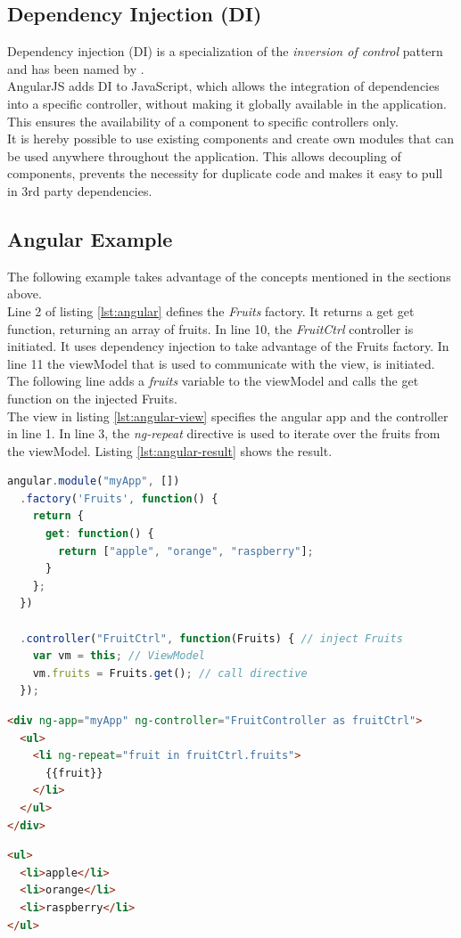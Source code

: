\subsection{Dependency Injection (DI)}
Dependency injection (DI) is a specialization of the \textit{inversion of control} pattern and has been named by \cite{fowler2004inversion}. \\
AngularJS adds DI to JavaScript, which allows the integration of dependencies into a specific controller, without making it globally available in the application. This ensures the availability of a component to specific controllers only.\\
It is hereby possible to use existing components and create own modules that can be used anywhere throughout the application. This allows decoupling of components, prevents the necessity for duplicate code and makes it easy to pull in 3rd party dependencies. 


\subsection{Angular Example}
The following example takes advantage of the concepts mentioned in the sections above. \\
Line 2 of listing \ref{lst:angular} defines the \textit{Fruits} factory. It returns a get get function, returning an array of fruits. In line 10, the \textit{FruitCtrl} controller is initiated. It uses dependency injection to take advantage of the Fruits factory. In line 11 the viewModel that is used to communicate with the view, is initiated. The following line adds a \textit{fruits} variable to the viewModel and calls the get function on the injected Fruits.\\
The view in listing \ref{lst:angular-view} specifies the angular app and the controller in line 1. In line 3, the \textit{ng-repeat} directive is used to iterate over the fruits from the viewModel. Listing \ref{lst:angular-result} shows the result.

\begin{lstlisting}[language=javascript, caption=AngularJS directive and controller definition, label=lst:angular]
angular.module("myApp", [])
  .factory('Fruits', function() {
    return {
      get: function() {
        return ["apple", "orange", "raspberry"];
      }
    };
  })
  
  .controller("FruitCtrl", function(Fruits) { // inject Fruits
    var vm = this; // ViewModel
    vm.fruits = Fruits.get(); // call directive
  });
\end{lstlisting}

\begin{lstlisting}[language=html, caption=AngularJS template, label=lst:angular-view]
<div ng-app="myApp" ng-controller="FruitController as fruitCtrl">
  <ul>
    <li ng-repeat="fruit in fruitCtrl.fruits">
      {{fruit}}
    </li>
  </ul>
</div>
\end{lstlisting}

\begin{lstlisting}[language=html, caption=HTML result, label=lst:angular-result]
<ul>
  <li>apple</li>
  <li>orange</li>
  <li>raspberry</li>
</ul>
\end{lstlisting}
